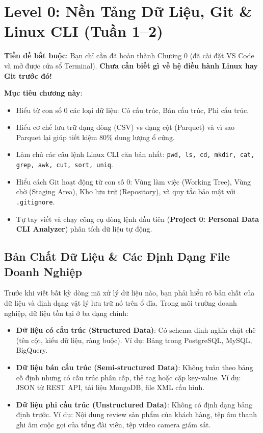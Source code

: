 \chapter{Level 0: Nền Tảng Dữ Liệu, Git \& Linux CLI (Tuần 1--2)}

\begin{lythuyetbox}
\textbf{Tiền đề bắt buộc}: Bạn chỉ cần đã hoàn thành Chương 0 (đã cài đặt VS Code và mở được cửa sổ Terminal). \textbf{Chưa cần biết gì về hệ điều hành Linux hay Git trước đó!}

\textbf{Mục tiêu chương này}:
\begin{itemize}
    \item Hiểu từ con số 0 các loại dữ liệu: Có cấu trúc, Bán cấu trúc, Phi cấu trúc.
    \item Hiểu cơ chế lưu trữ dạng dòng (CSV) vs dạng cột (Parquet) và vì sao Parquet lại giúp tiết kiệm 80\% dung lượng ổ cứng.
    \item Làm chủ các câu lệnh Linux CLI căn bản nhất: \texttt{pwd, ls, cd, mkdir, cat, grep, awk, cut, sort, uniq}.
    \item Hiểu cách Git hoạt động từ con số 0: Vùng làm việc (Working Tree), Vùng chờ (Staging Area), Kho lưu trữ (Repository), và quy tắc bảo mật với \texttt{.gitignore}.
    \item Tự tay viết và chạy công cụ dòng lệnh đầu tiên (\textbf{Project 0: Personal Data CLI Analyzer}) phân tích dữ liệu tự động.
\end{itemize}
\end{lythuyetbox}

\section{Bản Chất Dữ Liệu \& Các Định Dạng File Doanh Nghiệp}

Trước khi viết bất kỳ dòng mã xử lý dữ liệu nào, bạn phải hiểu rõ bản chất của dữ liệu và định dạng vật lý lưu trữ nó trên ổ đĩa. Trong môi trường doanh nghiệp, dữ liệu tồn tại ở ba dạng chính:
\begin{itemize}[leftmargin=*]
    \item \textbf{Dữ liệu có cấu trúc (Structured Data)}: Có schema định nghĩa chặt chẽ (tên cột, kiểu dữ liệu, ràng buộc). Ví dụ: Bảng trong PostgreSQL, MySQL, BigQuery.
    \item \textbf{Dữ liệu bán cấu trúc (Semi-structured Data)}: Không tuân theo bảng cố định nhưng có cấu trúc phân cấp, thẻ tag hoặc cặp key-value. Ví dụ: JSON từ REST API, tài liệu MongoDB, file XML cấu hình.
    \item \textbf{Dữ liệu phi cấu trúc (Unstructured Data)}: Không có định dạng bảng định trước. Ví dụ: Nội dung review sản phẩm của khách hàng, tệp âm thanh ghi âm cuộc gọi của tổng đài viên, tệp video camera giám sát.
\end{itemize}

